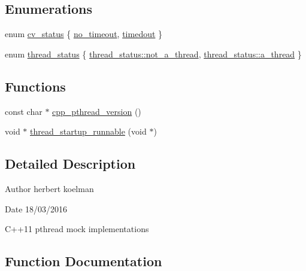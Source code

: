 \subsection*{Enumerations}
\begin{DoxyCompactItemize}
\item 
enum \hyperlink{group__concurrency_ga823f88a2bf448bd5bd5273b826830bdd}{cv\+\_\+status} \{ \hyperlink{group__concurrency_gga823f88a2bf448bd5bd5273b826830bdda633b1bc5140f77a22f2c26bea4fa3398}{no\+\_\+timeout}, 
\hyperlink{group__concurrency_gga823f88a2bf448bd5bd5273b826830bdda1c2d3e88a4ad820053c817753867b31a}{timedout}
 \}
\item 
enum \hyperlink{group__threads_gac4b6e78f3d72c946ace7a92f3bec4101}{thread\+\_\+status} \{ \hyperlink{group__threads_ggac4b6e78f3d72c946ace7a92f3bec4101a8414cd8c988083af4eabb1311df873cf}{thread\+\_\+status\+::not\+\_\+a\+\_\+thread}, 
\hyperlink{group__threads_ggac4b6e78f3d72c946ace7a92f3bec4101a13b3689524b86ca2caaee82399099df1}{thread\+\_\+status\+::a\+\_\+thread}
 \}
\end{DoxyCompactItemize}
\subsection*{Functions}
\begin{DoxyCompactItemize}
\item 
const char $\ast$ \hyperlink{namespacepthread_ad04d8bbcf57d64ba29047b53432a9ceb}{cpp\+\_\+pthread\+\_\+version} ()
\item 
void $\ast$ \hyperlink{group__threads_ga4ca2138b7b0d82d63a05c708edd45a6f}{thread\+\_\+startup\+\_\+runnable} (void $\ast$)
\end{DoxyCompactItemize}


\subsection{Detailed Description}
\begin{DoxyAuthor}{Author}
herbert koelman 
\end{DoxyAuthor}
\begin{DoxyDate}{Date}
18/03/2016
\end{DoxyDate}
C++11 pthread mock implementations 

\subsection{Function Documentation}
